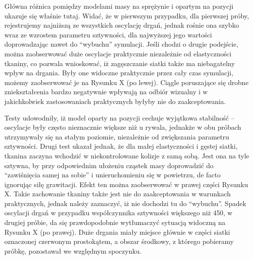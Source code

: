 		
		Główna różnica pomiędzy modelami masy na sprężynie i opartym na pozycji ukazuje się właśnie tutaj. Widać, że w pierwszym przypadku, dla pierwszej próby, rejestrujemy najniższą ze wszystkich oscylację drgań, jednak rośnie ona szybko wraz ze wzrostem parametru sztywności, dla najwyższej jego wartości doprowadzając nawet do ``wybuchu'' symulacji. Jeśli chodzi o drugie podejście, można zaobserwować duże oscylacje praktycznie niezależnie od elastyczności tkaniny, co pozwala wnioskować, iż zagęszczanie siatki także ma niebagatelny wpływ na drgania. Były one widoczne praktycznie przez cały czas symulacji, możemy zaobserwować je na Rysunku X (po lewej). Ciągle poruszające się drobne zniekształcenia bardzo negatywnie wpływają na odbiór wizualny i w jakichkolwiek zastosowaniach praktycznych byłyby nie do zaakceptowania.
		
		Testy udowodniły, iż model oparty na pozycji cechuje wyjątkowa stabilność -- oscylacje były często nieznacznie większe niż u rywala, jednakże w obu próbach utrzymywały się na stałym poziomie, niezależnie od zwiększania parametru sztywności. Drugi test ukazał jednak, że dla małej elastyczności i gęstej siatki, tkanina zaczyna wchodzić w niekontrolowane kolizje z samą sobą. Jest ona na tyle sztywna, by przy odpowiednim ułożeniu cząstek masy doprowadzić do ``zawiśnięcia samej na sobie'' i unieruchomieniu się w powietrzu, de facto ignorując siłę grawitacji. Efekt ten można zaobserwować w prawej części Rysunku X. Takie zachowanie tkaniny także jest nie do zaakceptowania w warunkach praktycznych, jednak należy zaznaczyć, iż nie dochodzi tu do ``wybuchu''. Spadek oscylacji drgań w przypadku współczynnika sztywności większego niż 450, w drugiej próbie, da się prawdopodobnie wytłumaczyć sytuacją widoczną na Rysunku X (po prawej). Duże drgania miały miejsce głównie w części siatki oznaczonej czerwonym prostokątem, a obszar środkowy, z którego pobieramy próbkę, pozostawał we względnym spoczynku.
		
		
		
		
